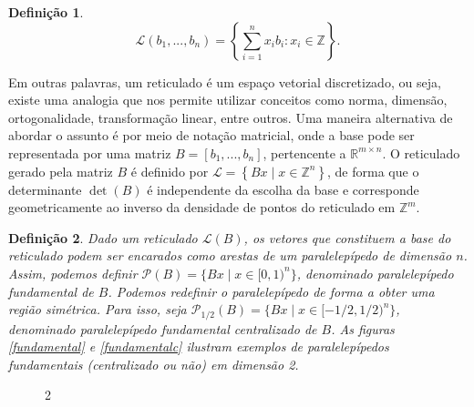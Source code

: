 \documentclass{SBCbookchapter}
\newtheorem{definition}{Definição}{\bfseries}{\itshape}
\begin{document}
\begin{otherlanguage}{brazilian}
\begin{definition}
$$\mathcal{L}(b_1,...,b_n) = \left\{\sum_{i=1}^{n} x_ib_i : x_i \in \mathbb{Z}\right\}. $$
\end{definition}

Em outras palavras, um reticulado é um espaço vetorial discretizado, ou seja, existe uma analogia que nos permite utilizar conceitos como norma, dimensão, ortogonalidade, transformação linear, entre outros. Uma maneira alternativa de abordar o assunto é por meio de notação matricial, onde a base pode ser representada por uma matriz $B = [b_1, ..., b_n]$, pertencente a $\mathbb{R}^{m \times n}$. 
O reticulado gerado pela matriz $B$ é definido por $\mathcal{L} = \left\{ Bx \mid x \in \mathbb{Z}^n \right\}$, de forma que o determinante $\det{(B)}$ é independente da escolha da base e corresponde geometricamente ao inverso da densidade de pontos do reticulado em $\mathbb{Z}^m$.  

\begin{definition}
Dado um reticulado $\mathcal{L}(B)$, os vetores que constituem a base do reticulado podem ser encarados como arestas de um paralelepípedo de dimensão $n$. Assim, podemos definir $\mathcal{P}(B) = \{Bx \mid x \in [0,1)^n\}$, denominado \textit{paralelepípedo fundamental} de $B$. 
Podemos redefinir o paralelepípedo de forma a obter uma região simétrica. Para isso, seja $\mathcal{P}_{1/2}(B) = \{Bx \mid x \in [-1/2,1/2)^n\}$, denominado \textit{paralelepípedo fundamental centralizado} de $B$. As figuras \ref{fundamental} e \ref{fundamentalc} ilustram exemplos de paralelepípedos fundamentais (centralizado ou não) em dimensão 2.  
\end{definition}


\begin{figure}[ht]
\begin{center}
\begin{multicols}{2}
\end{multicols}
\end{center}
\end{figure}
\end{otherlanguage}
\end{document}
